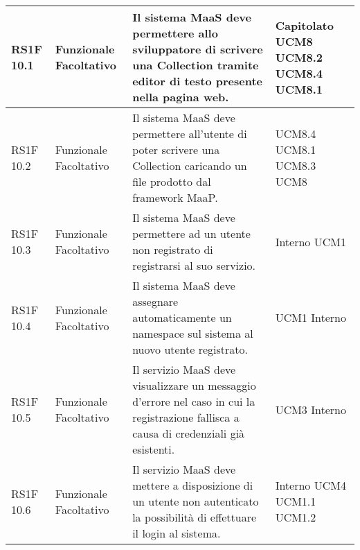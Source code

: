 \begin{center}
\begin{longtable}{ | l | p{2cm} | p{5cm} | p{1.7cm} |}
        RS1F 10.1 & Funzionale \newline  Facoltativo  & Il sistema MaaS deve permettere allo sviluppatore di scrivere una Collection tramite editor di testo presente nella pagina web. &  Capitolato \newline  UCM8 \newline  UCM8.2 \newline  UCM8.4 \newline  UCM8.1 \newline  \\ \hline      
        RS1F 10.2 & Funzionale \newline  Facoltativo  & Il sistema MaaS deve permettere all'utente di poter scrivere una Collection caricando un file prodotto dal framework MaaP. &  UCM8.4 \newline  UCM8.1 \newline  UCM8.3 \newline  UCM8 \newline  \\ \hline      
        RS1F 10.3 & Funzionale \newline  Facoltativo  & Il sistema MaaS deve permettere ad un utente non registrato di registrarsi al suo servizio. &  Interno \newline  UCM1 \newline  \\ \hline      
        RS1F 10.4 & Funzionale \newline  Facoltativo  & Il sistema MaaS deve assegnare automaticamente un namespace sul sistema al nuovo utente registrato. &  UCM1 \newline  Interno \newline  \\ \hline      
        RS1F 10.5 & Funzionale \newline  Facoltativo  & Il servizio MaaS deve visualizzare un messaggio d'errore nel caso in cui la registrazione fallisca a causa di credenziali già esistenti. &  UCM3 \newline  Interno \newline  \\ \hline      
        RS1F 10.6 & Funzionale \newline  Facoltativo  & Il servizio MaaS deve mettere a disposizione di un utente non autenticato la possibilità di effettuare il login al sistema. &  Interno \newline  UCM4 \newline  UCM1.1 \newline  UCM1.2 \newline  \\ \hline      

\end{longtable}
\end{center}

